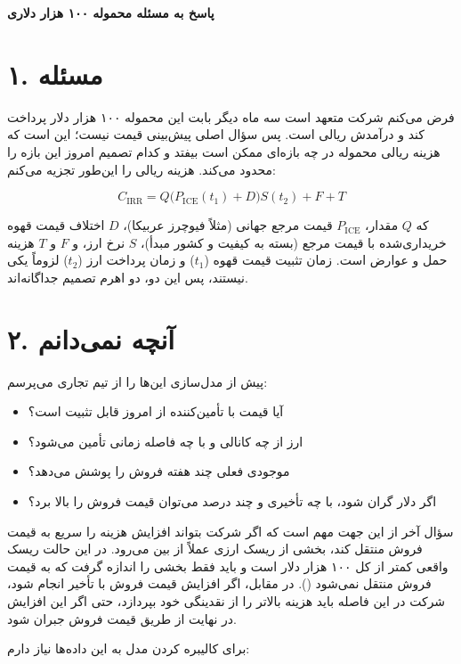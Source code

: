 \documentclass[12pt,a4paper]{article}
\begin{document}
\begin{center}
    {\Large\textbf{پاسخ به مسئله محموله ۱۰۰ هزار دلاری}}
\end{center}

\section*{۱. مسئله}

فرض می‌کنم شرکت متعهد است سه ماه دیگر بابت این محموله ۱۰۰ هزار دلار پرداخت کند و درآمدش ریالی است. پس سؤال
اصلی پیش‌بینی قیمت نیست؛ این است که هزینه ریالی محموله در چه بازه‌ای ممکن است
بیفتد و کدام تصمیم امروز این بازه را محدود می‌کند. هزینه ریالی را این‌طور
تجزیه می‌کنم:

\[
C_{\mathrm{IRR}} = Q\bigl(P_{\mathrm{ICE}}(t_1)+D\bigr)S(t_2) + F + T
\]

که \(Q\) مقدار، \(P_{\mathrm{ICE}}\) قیمت مرجع جهانی (مثلاً فیوچرز عربیکا)،
\(D\) اختلاف قیمت قهوه خریداری‌شده با قیمت مرجع (بسته به کیفیت و کشور مبدأ)، \(S\) نرخ ارز، و \(F\) و \(T\) هزینه حمل و
عوارض است. زمان تثبیت قیمت قهوه (\(t_1\)) و زمان پرداخت ارز (\(t_2\)) لزوماً
یکی نیستند، پس این دو، دو اهرم تصمیم جداگانه‌اند.

\section*{۲. آنچه نمی‌دانم}

پیش از مدل‌سازی این‌ها را از تیم تجاری می‌پرسم:

\begin{itemize}[label=$\circ$]
    \item آیا قیمت با تأمین‌کننده از امروز قابل تثبیت است؟
    \item ارز از چه کانالی و با چه فاصله زمانی تأمین می‌شود؟
    \item موجودی فعلی چند هفته فروش را پوشش می‌دهد؟
    \item اگر دلار گران شود، با چه تأخیری و چند درصد می‌توان قیمت فروش را بالا برد؟
\end{itemize}

سؤال آخر از این جهت مهم است که اگر شرکت بتواند افزایش هزینه را سریع به قیمت
فروش منتقل کند، بخشی از ریسک ارزی عملاً از بین می‌رود. در این حالت ریسک واقعی
کمتر از کل ۱۰۰ هزار دلار است و باید فقط بخشی را اندازه گرفت که به قیمت فروش
منتقل نمی‌شود (). در مقابل، اگر افزایش قیمت فروش با تأخیر
انجام شود، شرکت در این فاصله باید هزینه بالاتر را از نقدینگی خود بپردازد، حتی
اگر این افزایش در نهایت از طریق قیمت فروش جبران شود.

برای کالیبره کردن مدل به این داده‌ها نیاز دارم:
\end{document}
